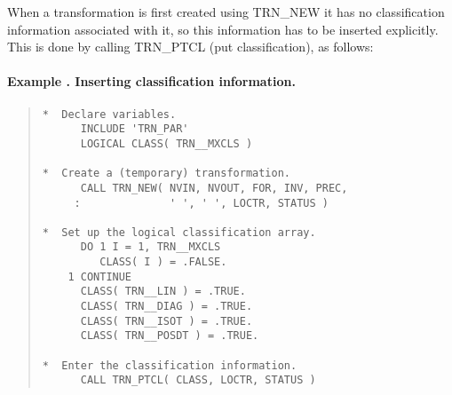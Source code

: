 \documentclass[twoside,11pt]{article}
\newcommand{\name}[1]{\mbox{\small{#1}}}
\newcommand{\numcir}[1]{\mbox{\hspace{3ex}\fbox{#1}}}
\newcounter{examplecounter}
\newcommand{\example}[1]{\addtocounter{examplecounter}{1}
                         \paragraph{\textbf{Example \theexamplecounter. #1}}}
\begin{document}
When a transformation is first created using \name{TRN\_NEW} it has no
classification information associated with it, so this information has to be
inserted explicitly. 
This is done by calling \name{TRN\_PTCL} (put classification), as follows: 

\example{Inserting classification information.}

\begin{quote}
\begin{tabbing} 

\verb#*  Declare variables.                                  #\\
\verb#      INCLUDE 'TRN_PAR'                                #\\
\verb#      LOGICAL CLASS( TRN__MXCLS )                      #\numcir{1}\\
\verb#                                                       #\\
\verb#*  Create a (temporary) transformation.                #\\
\verb#      CALL TRN_NEW( NVIN, NVOUT, FOR, INV, PREC,       #\numcir{2}\\
\verb#     :              ' ', ' ', LOCTR, STATUS )          #\\
\verb#                                                       #\\
\verb#*  Set up the logical classification array.            #\\
\verb#      DO 1 I = 1, TRN__MXCLS                           #\numcir{3}\\
\verb#         CLASS( I ) = .FALSE.                          #\\
\verb#    1 CONTINUE                                         #\\
\verb#      CLASS( TRN__LIN ) = .TRUE.                       #\numcir{4}\\
\verb#      CLASS( TRN__DIAG ) = .TRUE.                      #\\
\verb#      CLASS( TRN__ISOT ) = .TRUE.                      #\\
\verb#      CLASS( TRN__POSDT ) = .TRUE.                     #\\
\verb#                                                       #\\
\verb#*  Enter the classification information.               #\\
\verb#      CALL TRN_PTCL( CLASS, LOCTR, STATUS )            #\numcir{5}

\end{tabbing}
\end{quote} 
\end{document}

